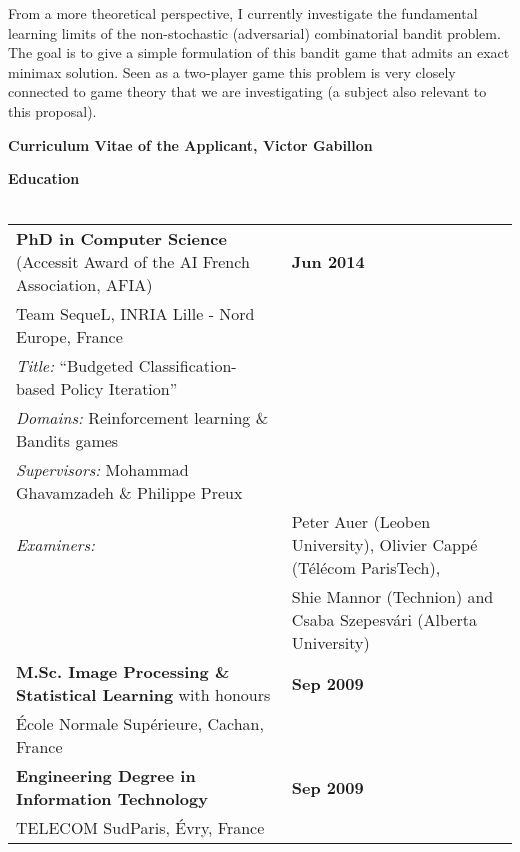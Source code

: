 From a more theoretical perspective, I currently investigate the fundamental learning limits of the non-stochastic (adversarial) combinatorial bandit problem. The goal is to give a simple formulation of this bandit game that admits an exact minimax solution. Seen as a two-player game this problem is very closely connected to game theory that we are investigating (a subject also relevant to this proposal).


 \begin{center} \textbf{Curriculum Vitae of the Applicant,  Victor Gabillon}  \end{center}
 
\noindent\textbf{Education}\\[-.4cm]\noindent\makebox[\linewidth]{\rule{\columnwidth}{0.4pt}}\\[.1cm]
\noindent\begin{tabularx}{\columnwidth}{@{} l X @{}}
\noindent\textbf{PhD in Computer Science} (Accessit Award of the AI French Association, AFIA)& \hfill \textbf{Jun 2014} \\
Team SequeL, INRIA Lille - Nord Europe, France\\
\textit{Title:} ``Budgeted Classification-based Policy Iteration''\\
\textit{Domains:} Reinforcement learning \& Bandits games\\
\textit{Supervisors:}  Mohammad Ghavamzadeh \&  Philippe Preux\\
\noindent\textit{Examiners:}\begin{tabular}{ll}  &Peter Auer (Leoben University), Olivier Cappé   (Télécom ParisTech), \\
\noindent & Shie Mannor   (Technion)  and Csaba Szepesvári  (Alberta  University)  
\end{tabular}\\[.2cm]
\textbf{M.Sc. Image Processing \& Statistical Learning} with honours &\hfill \textbf{ Sep 2009}\\
 École Normale Supérieure, Cachan, France\\[.2cm]
\textbf{Engineering Degree in Information Technology}  &\hfill \textbf{ Sep 2009}\\
 TELECOM SudParis, Évry, France
\end{tabularx}\\[.2cm]

